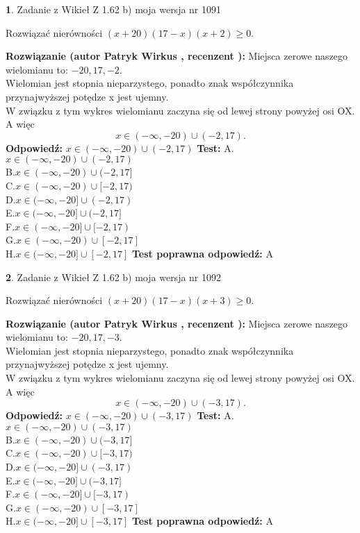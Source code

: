 \documentclass[12pt, a4paper]{article}
\theoremstyle{definition} %
\newtheorem{zad}{}
\newcommand{\zadStart}[1]{\begin{zad}#1\newline}
\newcommand{\zadStop}{\end{zad}}
\newcommand{\rozwStart}[2]{\noindent \textbf{Rozwiązanie (autor #1 , recenzent #2): }\newline}
\newcommand{\rozwStop}{\newline}
\newcommand{\odpStart}{\noindent \textbf{Odpowiedź:}\newline}
\newcommand{\odpStop}{\newline}
\newcommand{\testStart}{\noindent \textbf{Test:}\newline}
\newcommand{\testStop}{\newline}
\newcommand{\kluczStart}{\noindent \textbf{Test poprawna odpowiedź:}\newline}
\newcommand{\kluczStop}{\newline}
\begin{document}
\zadStart{Zadanie z Wikieł Z 1.62 b) moja wersja nr 1091}

Rozwiązać nierówności $(x+20)(17-x)(x+2)\ge0$.
\zadStop
\rozwStart{Patryk Wirkus}{}
Miejsca zerowe naszego wielomianu to: $-20, 17, -2$.\\
Wielomian jest stopnia nieparzystego, ponadto znak współczynnika przy\linebreak najwyższej potędze x jest ujemny.\\ W związku z tym wykres wielomianu zaczyna się od lewej strony powyżej osi OX. A więc $$x \in (-\infty,-20) \cup (-2,17).$$
\rozwStop
\odpStart
$x \in (-\infty,-20) \cup (-2,17)$
\odpStop
\testStart
A.$x \in (-\infty,-20) \cup (-2,17)$\\
B.$x \in (-\infty,-20) \cup (-2,17]$\\
C.$x \in (-\infty,-20) \cup [-2,17)$\\
D.$x \in (-\infty,-20] \cup (-2,17)$\\
E.$x \in (-\infty,-20] \cup (-2,17]$\\
F.$x \in (-\infty,-20] \cup [-2,17)$\\
G.$x \in (-\infty,-20) \cup [-2,17]$\\
H.$x \in (-\infty,-20] \cup [-2,17]$
\testStop
\kluczStart
A
\kluczStop



\zadStart{Zadanie z Wikieł Z 1.62 b) moja wersja nr 1092}

Rozwiązać nierówności $(x+20)(17-x)(x+3)\ge0$.
\zadStop
\rozwStart{Patryk Wirkus}{}
Miejsca zerowe naszego wielomianu to: $-20, 17, -3$.\\
Wielomian jest stopnia nieparzystego, ponadto znak współczynnika przy\linebreak najwyższej potędze x jest ujemny.\\ W związku z tym wykres wielomianu zaczyna się od lewej strony powyżej osi OX. A więc $$x \in (-\infty,-20) \cup (-3,17).$$
\rozwStop
\odpStart
$x \in (-\infty,-20) \cup (-3,17)$
\odpStop
\testStart
A.$x \in (-\infty,-20) \cup (-3,17)$\\
B.$x \in (-\infty,-20) \cup (-3,17]$\\
C.$x \in (-\infty,-20) \cup [-3,17)$\\
D.$x \in (-\infty,-20] \cup (-3,17)$\\
E.$x \in (-\infty,-20] \cup (-3,17]$\\
F.$x \in (-\infty,-20] \cup [-3,17)$\\
G.$x \in (-\infty,-20) \cup [-3,17]$\\
H.$x \in (-\infty,-20] \cup [-3,17]$
\testStop
\kluczStart
A
\kluczStop
\end{document}
